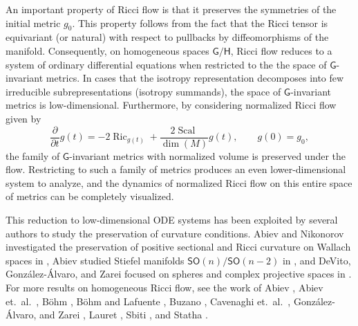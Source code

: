 \documentclass{amsart}
\numberwithin{equation}{section}
\theoremstyle{plain}
\theoremstyle{definition}
\theoremstyle{remark}
\numberwithin{table}{section}
\DeclareMathOperator{\Ric}{Ric}
\DeclareMathOperator{\Scal}{Scal}
\newcommand{\gG}{\mathsf{G}}
\newcommand{\gH}{\mathsf{H}}
\newcommand{\SO}{\mathsf{SO}}
\begin{document}
An important property of Ricci flow is that it preserves the symmetries of the initial metric $g_0$.
This property follows from the fact that the Ricci tensor is equivariant (or natural) with respect to pullbacks by diffeomorphisms of the manifold. 
Consequently, on homogeneous spaces $\gG/\gH$, Ricci flow reduces to a system of ordinary differential equations when restricted to the the space of $\gG$-invariant metrics. 
In cases that the isotropy representation decomposes into few irreducible subrepresentations (isotropy summands), the space of $\gG$-invariant metrics is low-dimensional.
Furthermore, by considering normalized Ricci flow given by
\[
    \frac{\partial}{\partial t} g(t) = -2 \Ric_{g(t)} + \frac{2 \Scal}{\dim (M)} g(t), \qquad g(0)=g_0,
\]
the family of $\gG$-invariant metrics with normalized volume is preserved under the flow.
Restricting to such a family of metrics produces an even lower-dimensional system to analyze, and the dynamics of normalized Ricci flow on this entire space of metrics can be completely visualized.

This reduction to low-dimensional ODE systems has been exploited by several authors to study the preservation of curvature conditions.
Abiev and Nikonorov investigated the preservation of positive sectional and Ricci curvature on Wallach spaces in \cite{AbievNikonorov16}, 
Abiev studied Stiefel manifolds $\SO(n)/\SO(n-2)$ in \cite{Abiev25b}, and DeVito, Gonz\'alez-\'Alvaro, and Zarei focused on spheres and complex projective spaces in \cite{DGAZpreprint}.
For more results on homogeneous Ricci flow, see the work of Abiev \cite{Abiev25a}, Abiev et.~al.~\cite{AANS14}, B\"ohm \cite{Bohm15}, B\"ohm and Lafuente \cite{BohmLafuente18}, Buzano \cite{Buzano14}, Cavenaghi et.~al.~\cite{CGM}, Gonz\'alez-\'Alvaro, and Zarei \cite{GAZ24,GAZ25}, Lauret \cite{Lauret13}, Sbiti \cite{Sbiti20}, and Statha \cite{Statha22}.
\end{document}
